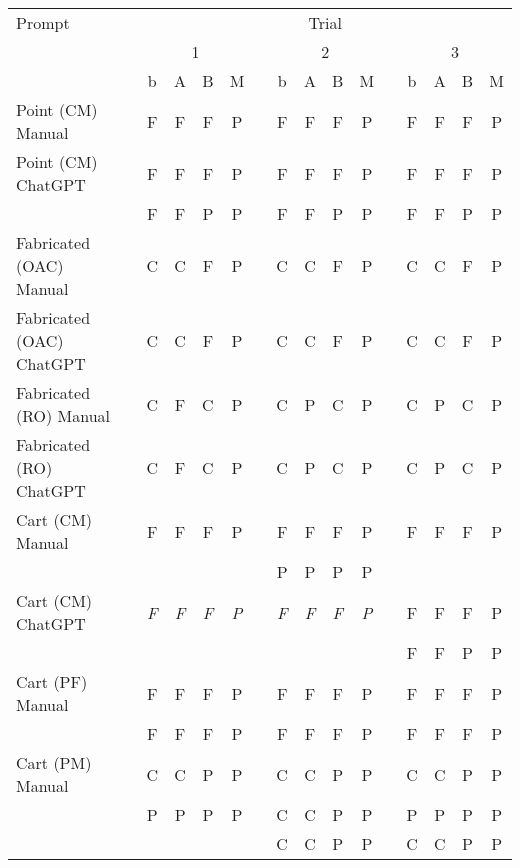 \begin{table}[t]
    \centering
    \begin{tabular}{@{\extracolsep{\fill}} llcccccccccccccc} 
        \toprule
        Prompt & & \multicolumn{14}{c}{Trial} \\ 
        \cmidrule(lr){3-16}
        & & \multicolumn{4}{c}{1} & \multicolumn{6}{c}{2} & \multicolumn{4}{c}{3} \\ 
                            & & b & A & B & M & & b & A & B & M & & b & A & B & M \\ 
\midrule
Point (CM) Manual           & & F & F & F & P & & F & F & F & P & & F & F & F & P \\ 
Point (CM) ChatGPT          & & F & F & F & P & & F & F & F & P & & F & F & F & P \\ 
                            & & F & F & P & P & & F & F & P & P & & F & F & P & P \\ 
Fabricated (OAC) Manual     & & C & C & F & P & & C & C & F & P & & C & C & F & P \\ 
Fabricated (OAC) ChatGPT    & & C & C & F & P & & C & C & F & P & & C & C & F & P \\ 
Fabricated (RO) Manual      & & C & F & C & P & & C & P & C & P & & C & P & C & P \\ 
Fabricated (RO) ChatGPT     & & C & F & C & P & & C & P & C & P & & C & P & C & P \\
Cart (CM) Manual            & & F & F & F & P & & F & F & F & P & & F & F & F & P \\ 
                            & &   &   &   &   & & P & P & P & P & &   &   &   &   \\ 
Cart (CM) ChatGPT           & & \textit{F} & \textit{F} & \textit{F} & \textit{P} & & \textit{F} & \textit{F} & \textit{F} & \textit{P} & & F & F & F & P \\ %
                            & &   &   &   &   & &   &   &   &   & & F & F & P & P \\ 
Cart (PF) Manual            & & F & F & F & P & & F & F & F & P & & F & F & F & P \\ 
                            & & F & F & F & P & & F & F & F & P & & F & F & F & P \\ 
Cart (PM) Manual            & & C & C & P & P & & C & C & P & P & & C & C & P & P \\ 
                            & & P & P & P & P & & C & C & P & P & & P & P & P & P \\ 
                            & &   &   &   &   & & C & C & P & P & & C & C & P & P \\ 

\end{tabular}
\end{table}
